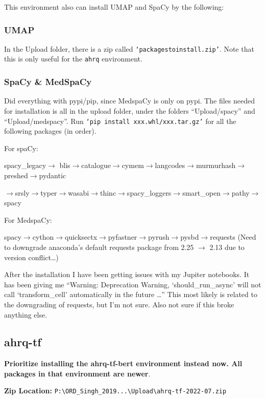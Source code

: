 \documentclass[12pt]{article}
\theoremstyle{definition}
\begin{document}
This environment also can install UMAP and SpaCy by the following:

\subsubsection{UMAP}
In the Upload folder, there is a zip called \texttt{`packagestoinstall.zip'}. Note that this is only useful for the \texttt{ahrq} environment.

\subsubsection{SpaCy \& MedSpaCy}
Did everything with pypi/pip, since MedspaCy is only on pypi. The files needed for installation is all in the upload folder, under the folders ``Upload/spacy'' and ``Upload/medspacy''. Run \texttt{`pip install xxx.whl/xxx.tar.gz'} for all the following packages (in order).

For spaCy:

spacy\_legacy$\rightarrow$ blis$\rightarrow$catalogue$\rightarrow$cymem$\rightarrow$langcodes$\rightarrow$murmurhash$\rightarrow$preshed$\rightarrow$pydantic

$\rightarrow$srsly$\rightarrow$typer$\rightarrow$wasabi$\rightarrow$thinc$\rightarrow$spacy\_loggers$\rightarrow$smart\_open$\rightarrow$pathy$\rightarrow$spacy

For MedspaCy:

spacy$\rightarrow$cython$\rightarrow$quicksectx$\rightarrow$pyfastner$\rightarrow$pyrush$\rightarrow$pysbd$\rightarrow$requests
(Need to downgrade anaconda's default requests package from 2.25 $\rightarrow$ 2.13 due to version conflict\dots)

After the installation I have been getting issues with my Jupiter notebooks. It has been giving me ``Warning: Deprecation Warning, `should\_run\_async' will not call `transform\_cell' automatically in the future \dots'' This most likely is related to the downgrading of requests, but I'm not sure. Also not sure if this broke anything else.

\subsection{ahrq-tf}
\textbf{Prioritize installing the ahrq-tf-bert environment instead now. All packages in that environment are newer}.

\textbf{Zip Location: }\texttt{P:\textbackslash ORD\_Singh\_2019...\textbackslash Upload\textbackslash ahrq-tf-2022-07.zip}
\end{document}

